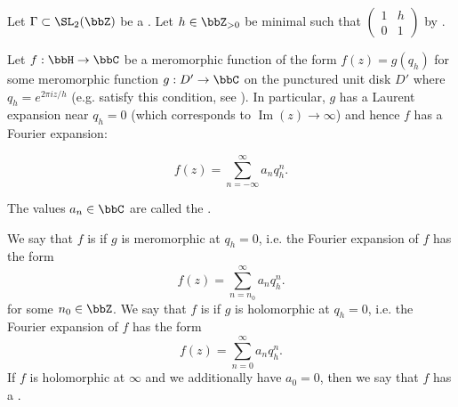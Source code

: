\begin{definition} \label{definition:holomorphic_at_infinity_for_a_meromorphic_function_on_the_upper_half_plane}
    Let $\Gamma \subset \SL_2(\bbZ)$ be a .
    Let $h \in \bbZ_{> 0}$ be minimal such that $\begin{pmatrix} 1 & h \\ 0 & 1 \end{pmatrix}$ by . 

    Let $f: \bbH \to \bbC$ be a meromorphic function of the form $f(z) = g(q_h)$ for some meromorphic function $g: D' \to \bbC$ on the punctured unit disk $D'$ where $q_h = e^{2 \pi i z/h}$ (e.g.  satisfy this condition, see ). In particular, $g$ has a Laurent expansion near $q_h = 0$ (which corresponds to $\operatorname{Im}(z) \to \infty$)  and hence $f$ has a Fourier expansion: 

    $$f(z) = \sum_{n=-\infty}^\infty a_n q_h^n.$$
    
    The values $a_n \in \bbC$ are called the .

    We say that $f$ is  if $g$ is meromorphic at $q_h = 0$, i.e. the Fourier expansion of $f$ has the form
    $$f(z) = \sum_{n=n_0}^\infty a_n q_h^n.$$
    for some $n_0 \in \bbZ$. We say that $f$ is  if $g$ is holomorphic at $q_h = 0$, i.e. the Fourier expansion of $f$ has the form
    $$f(z) = \sum_{n=0}^\infty a_n q_h^n.$$
    If $f$ is holomorphic at $\infty$ and we additionally have $a_0 = 0$, then we say that $f$ has a .
\end{definition}